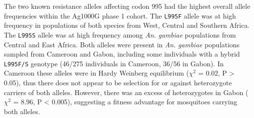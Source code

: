 \documentclass[a4paper,11pt,abstracton,hidelinks]{scrartcl}
\begin{document}
{\begin{landscape}
\begin{table}[h]
\begin{threeparttable}
\begin{tablenotes}
  \end{tablenotes}
  
  \end{threeparttable}
  
\end{table}
\end{landscape}
\restoregeometry
} %


The two known resistance alleles affecting codon 995 had the highest overall allele frequencies within the Ag1000G phase 1 cohort.
%
The \texttt{L995F} allele was at high frequency in populations of both species from West, Central and Southern Africa.
%
The \texttt{L995S} allele was at high frequency among \textit{An. gambiae} populations from Central and East Africa.
%
Both alleles were present in \textit{An. gambiae} populations sampled from Cameroon and Gabon, including some individuals with a hybrid \texttt{L995F/S} genotype (46/275 individuals in Cameroon, 36/56 in Gabon).
%
In Cameroon these alleles were in Hardy Weinberg equilibrium ($\chi^{2}$ = 0.02, P > 0.05), thus there does not appear to be selection for or against heterozygote carriers of both alleles.
%
However, there was an excess of heterozygotes in Gabon ($\chi^{2}$ = 8.96, P < 0.005), suggesting a fitness advantage for mosquitoes carrying both alleles.


\end{document}
